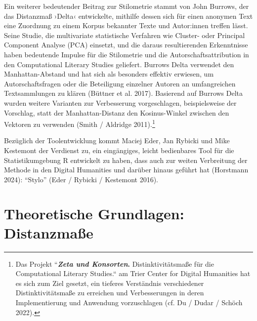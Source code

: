 \documentclass[
  12pt,
  letterpaper,
]{classicthesis}
\begin{document}
Ein weiterer bedeutender Beitrag zur Stilometrie stammt von John
Burrows, der das Distanzmaß ›Delta‹ entwickelte, mithilfe dessen sich
für einen anonymen Text eine Zuordnung zu einem Korpus bekannter Texte
und Autor:innen treffen lässt. Seine Studie, die multivariate
statistische Verfahren wie Cluster- oder Principal Component Analyse
(PCA) einsetzt, und die daraus resultierenden Erkenntnisse haben
bedeutende Impulse für die Stilometrie und die Autorschaftsattribution
in den Computational Literary Studies geliefert. Burrows Delta verwendet
den Manhattan-Abstand und hat sich als besonders effektiv erwiesen, um
Autorschaftsfragen oder die Beteiligung einzelner Autoren an
umfangreichen Textsammlungen zu klären (Büttner et al. 2017). Basierend
auf Burrows Delta wurden weitere Varianten zur Verbesserung
vorgeschlagen, beispielsweise der Vorschlag, statt der Manhattan-Distanz
den Kosinus-Winkel zwischen den Vektoren zu verwenden (Smith / Aldridge
2011).\footnote{Das Projekt ``\textbf{\emph{Zeta und Konsorten}.}
  Distinktivitätsmaße für die Computational Literary Studies.`` am Trier
  Center for Digital Humanities hat es sich zum Ziel gesetzt, ein
  tieferes Verständnis verschiedener Distinktivitätsmaße zu erreichen
  und Verbesserungen in deren Implementierung und Anwendung
  vorzuschlagen (cf. Du / Dudar / Schöch 2022).}

Bezüglich der Toolentwicklung kommt Maciej Eder, Jan Rybicki und Mike
Kestemont der Verdienst zu, ein eingängiges, leicht bedienbares Tool für
die Statistikumgebung R entwickelt zu haben, dass auch zur weiten
Verbreitung der Methode in den Digital Humanities und darüber hinaus
geführt hat (Horstmann 2024): ``Stylo'' (Eder / Rybicki / Kestemont
2016).

\section{Theoretische Grundlagen:
Distanzmaße}\label{theoretische-grundlagen-distanzmauxdfe}
\end{document}
